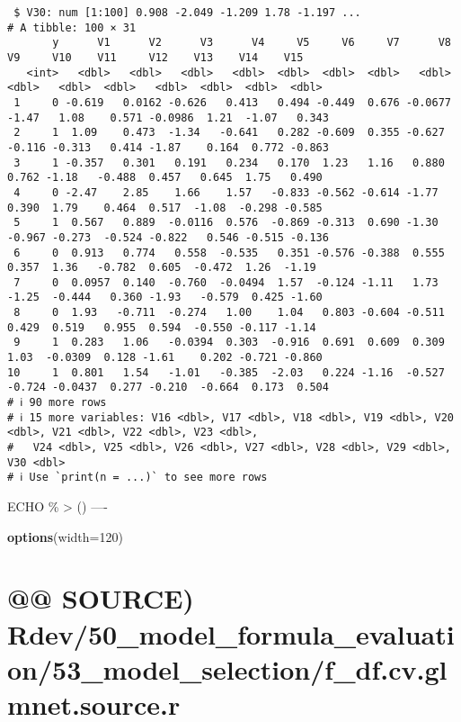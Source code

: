 \documentclass[
]{article}
\newenvironment{Shaded}{\begin{snugshade}}{\end{snugshade}}
\newcommand{\AttributeTok}[1]{\textcolor[rgb]{0.13,0.29,0.53}{#1}}
\newcommand{\DecValTok}[1]{\textcolor[rgb]{0.00,0.00,0.81}{#1}}
\newcommand{\FunctionTok}[1]{\textcolor[rgb]{0.13,0.29,0.53}{\textbf{#1}}}
\newcommand{\NormalTok}[1]{#1}
\begin{document}
\begin{verbatim}
 $ V30: num [1:100] 0.908 -2.049 -1.209 1.78 -1.197 ...
# A tibble: 100 × 31
       y      V1      V2      V3      V4     V5     V6     V7      V8     V9     V10    V11     V12    V13    V14    V15
   <int>   <dbl>   <dbl>   <dbl>   <dbl>  <dbl>  <dbl>  <dbl>   <dbl>  <dbl>   <dbl>  <dbl>   <dbl>  <dbl>  <dbl>  <dbl>
 1     0 -0.619   0.0162 -0.626   0.413   0.494 -0.449  0.676 -0.0677 -1.47   1.08    0.571 -0.0986  1.21  -1.07   0.343
 2     1  1.09    0.473  -1.34   -0.641   0.282 -0.609  0.355 -0.627  -0.116 -0.313   0.414 -1.87    0.164  0.772 -0.863
 3     1 -0.357   0.301   0.191   0.234   0.170  1.23   1.16   0.880   0.762 -1.18   -0.488  0.457   0.645  1.75   0.490
 4     0 -2.47    2.85    1.66    1.57   -0.833 -0.562 -0.614 -1.77    0.390  1.79    0.464  0.517  -1.08  -0.298 -0.585
 5     1  0.567   0.889  -0.0116  0.576  -0.869 -0.313  0.690 -1.30   -0.967 -0.273  -0.524 -0.822   0.546 -0.515 -0.136
 6     0  0.913   0.774   0.558  -0.535   0.351 -0.576 -0.388  0.555   0.357  1.36   -0.782  0.605  -0.472  1.26  -1.19 
 7     0  0.0957  0.140  -0.760  -0.0494  1.57  -0.124 -1.11   1.73   -1.25  -0.444   0.360 -1.93   -0.579  0.425 -1.60 
 8     0  1.93   -0.711  -0.274   1.00    1.04   0.803 -0.604 -0.511   0.429  0.519   0.955  0.594  -0.550 -0.117 -1.14 
 9     1  0.283   1.06   -0.0394  0.303  -0.916  0.691  0.609  0.309   1.03  -0.0309  0.128 -1.61    0.202 -0.721 -0.860
10     1  0.801   1.54   -1.01   -0.385  -2.03   0.224 -1.16  -0.527  -0.724 -0.0437  0.277 -0.210  -0.664  0.173  0.504
# ℹ 90 more rows
# ℹ 15 more variables: V16 <dbl>, V17 <dbl>, V18 <dbl>, V19 <dbl>, V20 <dbl>, V21 <dbl>, V22 <dbl>, V23 <dbl>,
#   V24 <dbl>, V25 <dbl>, V26 <dbl>, V27 <dbl>, V28 <dbl>, V29 <dbl>, V30 <dbl>
# ℹ Use `print(n = ...)` to see more rows
\end{verbatim}

ECHO \% \textbar\textgreater{} () ----

\begin{Shaded}
\begin{Highlighting}[]
\FunctionTok{options}\NormalTok{(}\AttributeTok{width=}\DecValTok{120}\NormalTok{)}
\end{Highlighting}
\end{Shaded}

\hypertarget{source-rdev50_model_formula_evaluation53_model_selectionf_df.cv.glmnet.source.r}{%
\section{@@ SOURCE)
Rdev/50\_model\_formula\_evaluation/53\_model\_selection/f\_df.cv.glmnet.source.r}\label{source-rdev50_model_formula_evaluation53_model_selectionf_df.cv.glmnet.source.r}}
\end{document}
